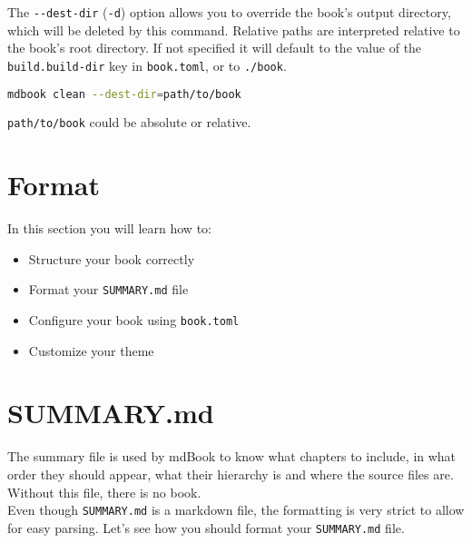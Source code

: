 \documentclass{article}
\begin{document}
The \lstinline|--dest-dir| (\lstinline|-d|) option allows you to override the book's output
directory, which will be deleted by this command. Relative paths are interpreted
relative to the book's root directory. If not specified it will default to the
value of the \lstinline|build.build-dir| key in \lstinline|book.toml|, or to \lstinline|./book|.\\
\begin{lstlisting}[language=bash]
mdbook clean --dest-dir=path/to/book

\end{lstlisting}

\lstinline|path/to/book| could be absolute or relative.\\

\section{Format}
\label{Format}
\label{format}

In this section you will learn how to:\\
\begin{itemize}
\item Structure your book correctly
\item Format your \lstinline|SUMMARY.md| file
\item Configure your book using \lstinline|book.toml|
\item Customize your theme
\end{itemize}

\section{SUMMARY.md}
\label{SUMMARY.md}
\label{summary-md}

The summary file is used by mdBook to know what chapters to include, in what
order they should appear, what their hierarchy is and where the source files
are. Without this file, there is no book.\\

Even though \lstinline|SUMMARY.md| is a markdown file, the formatting is very strict to
allow for easy parsing. Let's see how you should format your \lstinline|SUMMARY.md| file.\\
\end{document}
